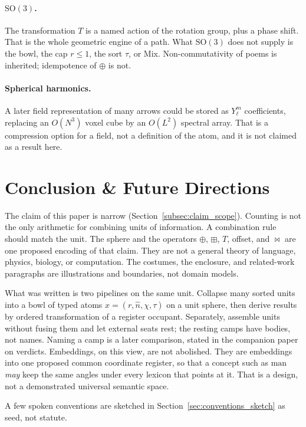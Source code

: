 \documentclass[12pt, a4paper]{article}
\begin{document}
\paragraph{$\mathrm{SO}(3)$.}
The transformation $T$ is a named action of the rotation group, plus a
phase shift. That is the whole geometric engine of a path. What
$\mathrm{SO}(3)$ does not supply is the bowl, the cap $r\le 1$, the
sort $\tau$, or Mix. Non-commutativity of poems is inherited;
idempotence of $\oplus$ is not.

\paragraph{Spherical harmonics.}
A later field representation of many arrows could be stored as
$Y_\ell^m$ coefficients, replacing an $O(N^3)$ voxel cube by an
$O(L^2)$ spectral array. That is a compression option for a field, not
a definition of the atom, and it is not claimed as a result here.

\section{Conclusion \& Future Directions}
\label{sec:conclusion}

The claim of this paper is narrow
(Section~\ref{subsec:claim_scope}). Counting is not the only
arithmetic for combining units of information. A combination rule
should match the unit. The sphere and the operators
$\oplus$, $\boxplus$, $T$, offset, and $\bowtie$ are one proposed
encoding of that claim. They are not a general theory of language,
physics, biology, or computation. The costumes, the enclosure, and
related-work paragraphs are illustrations and boundaries, not domain
models.

What was written is two pipelines on the same unit. Collapse many
sorted units into a bowl of typed atoms $x=(r,\hat n,\chi,\tau)$ on a
unit sphere, then derive results by ordered transformation of a
register occupant. Separately, assemble units without fusing them
and let external seats rest; the resting camps have bodies, not
names. Naming a camp is a later comparison, stated in the companion
paper on verdicts.
Embeddings, on this view, are
not abolished. They are embeddings into one proposed common coordinate
register, so that a
concept such as $\mathrm{man}$ \emph{may} keep the same angles under every
lexicon that points at it. That is a design, not a demonstrated
universal semantic space.

A few spoken conventions are sketched in
Section~\ref{sec:conventions_sketch} as seed, not statute.
\end{document}

